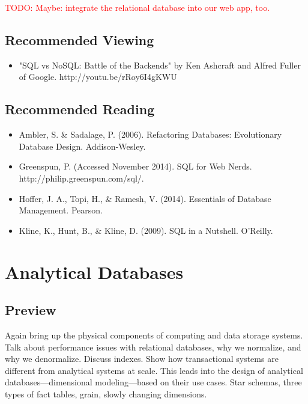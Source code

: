 \documentclass[11pt]{book}
\newcommand{\todo}[1]{\textcolor{red}{TODO: #1}} %
\begin{document}
\todo{Maybe: integrate the relational database into our web app, too.}

\section*{Recommended Viewing}
\begin{itemize}
    \item "SQL vs NoSQL: Battle of the Backends" by Ken Ashcraft and Alfred Fuller of Google.  http://youtu.be/rRoy6I4gKWU
\end{itemize}

\section*{Recommended Reading}
\begin{itemize}
    \item Ambler, S. \& Sadalage, P. (2006). Refactoring Databases: Evolutionary Database Design.  Addison-Wesley.
    \item Greenspun, P.  (Accessed November 2014). SQL for Web Nerds.\\ http://philip.greenspun.com/sql/.
    \item Hoffer, J. A., Topi, H., \& Ramesh, V. (2014). Essentials of Database Management.  Pearson.
    \item Kline, K., Hunt, B., \& Kline, D. (2009).  SQL in a Nutshell.  O'Reilly.
\end{itemize}









\chapter{Analytical Databases}\label{ch:olap}

\section*{Preview}

Again bring up the physical components of computing and data storage systems.  Talk about performance issues with relational databases, why we normalize, and why we denormalize.  Discuss indexes.  Show how transactional systems are different from analytical systems at scale.  This leads into the design of analytical databases---dimensional modeling---based on their use cases.  Star schemas, three types of fact tables, grain, slowly changing dimensions.
\end{document}
